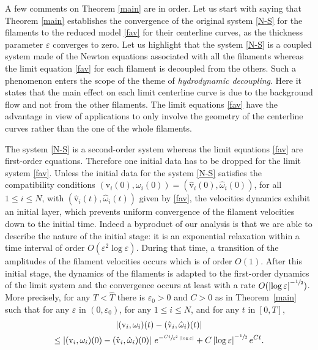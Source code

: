 \documentclass[JEP,XML,SOM,Unicode, NoEqCountersInSection,NoFloatCountersInSection,published]{cedram}
\let\eps\varepsilon
\theoremstyle{definition}
\theoremstyle{remark}
\begin{document}
A few comments on Theorem \ref{main} are in order. Let us start with saying that Theorem \ref{main} establishes the convergence of the original system \eqref{N-S} for the filaments to the reduced model \eqref{fav} for their centerline curves, as the thickness parameter $\eps$ converges to zero. Let us highlight that the system \eqref{N-S} is a coupled system made of the Newton equations associated with all the filaments whereas the limit equation \eqref{fav} for each filament is decoupled from the others. Such a phenomenon enters the scope
of the theme of \textit{hydrodynamic decoupling}. Here it states that the main effect on each limit centerline curve is due to the background flow and not from the other filaments. The limit equations \eqref{fav} have the advantage in view of applications to only involve the geometry of the centerline curves rather than the one of the whole filaments.

The system \eqref{N-S} is a second-order system whereas the limit equations \eqref{fav} are {first-order equations}. Therefore one initial data has to be dropped for the limit system \eqref{fav}. Unless
the initial data for the system \eqref{N-S} satisfies the compatibility conditions $(\textrm{v}_i (0),\omega_i (0)) = (\hat{\textrm{v}}_i(0),{\hat \omega}_i (0))$, for all $1 \leq i \leq N$, with $(\hat{\textrm{v}}_i(t),{\hat \omega}_i (t))$ given by \eqref{fav},
the velocities dynamics exhibit {an} initial layer, which prevents
uniform convergence of the filament velocities down to the initial time.
Indeed a byproduct of our analysis is that
we are able to describe the nature of the initial stage: it is an exponential relaxation within a time interval of order
$O(\eps^2 \log \eps)${. During that} time,
a transition of the amplitudes of the filament velocities occurs which is of order $O(1)$. After this initial stage, the dynamics of the filaments is adapted to the first-order dynamics of the limit system and the convergence occurs at least with a rate $O(\left|\log \eps \right|^{-\sfrac12})$.
More precisely, {for any $T < \hat T$ there is $\eps_0 > 0$ and $C>0$ as in Theorem~\ref{main}} such that for any $\eps $ in $(0,\eps_0)$, for any $1 \leq i \leq N$, and for any $t$ in $[0,T]$,%
\begin{multline}
\left| ({\textrm{v}}_i,\omega_{i})(t) - ({\hat {\textrm{v}}}_i, \hat \omega_i) (t) \right|\\
\leq \left| (\textrm{v}_i,\omega_i) (0)-
(\hat{\textrm{v}}_i,{\hat \omega}_i) (0) \right| \, e^{- \sfrac{C t}{\eps^2 \left|\log \eps\right|}} + C \left|\log \eps\right|^{-\sfrac12} e^{Ct}. \label{allezesti}
\end{multline}
\end{document}
